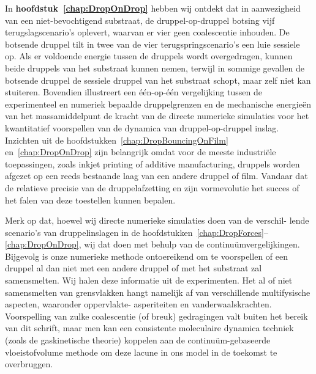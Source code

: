 In \textbf{hoofdstuk~\ref{chap:DropOnDrop}} hebben wij ontdekt dat in aanwezigheid van een niet-bevochtigend substraat, de druppel-op-druppel botsing vijf terugslagscenario's oplevert, waarvan er vier geen coalescentie inhouden. De botsende druppel tilt in twee van de vier terugspringscenario's een luie sessiele op. Als er voldoende energie tussen de druppels wordt overgedragen, kunnen beide druppels van het substraat kunnen nemen, terwijl in sommige gevallen de botsende druppel de sessiele druppel van het substraat schopt, maar zelf niet kan stuiteren. Bovendien illustreert een {\'e}{\'e}n-op-{\'e}{\'e}n vergelijking tussen de experimenteel en numeriek bepaalde druppelgrenzen en de mechanische energieën van het massamiddelpunt de kracht van de directe numerieke simulaties voor het kwantitatief voorspellen van de dynamica van druppel-op-druppel inslag. Inzichten uit de hoofdstukken~\ref{chap:DropBouncingOnFilm}  en~\ref{chap:DropOnDrop}  zijn belangrijk omdat voor de meeste industriële toepassingen, zoals inkjet printing of additive manufacturing, druppels worden afgezet op een reeds bestaande laag van een andere druppel of film. Vandaar dat de relatieve precisie van de druppelafzetting en zijn vormevolutie het succes of het falen van deze toestellen kunnen bepalen. 

Merk op dat, hoewel wij directe numerieke simulaties doen van de verschil- lende scenario’s van druppelinslagen in de hoofdstukken~\ref{chap:DropForces}--\ref{chap:DropOnDrop}, wij dat doen met behulp van de continu{\"u}mvergelijkingen. Bijgevolg is onze numerieke methode ontoereikend om te voorspellen of een druppel al dan niet met een andere druppel of met het substraat zal samensmelten. Wij halen deze informatie uit de experimenten. Het al of niet samensmelten van grensvlakken hangt namelijk af van verschillende multifysische aspecten, waaronder oppervlakte- asperiteiten en vanderwaalskrachten. Voorspelling van zulke coalescentie (of breuk) gedragingen valt buiten het bereik van dit schrift, maar men kan een consistente moleculaire dynamica techniek (zoals de gaskinetische theorie) koppelen aan de continu{\"u}m-gebaseerde vloeistofvolume methode om deze lacune in ons model in de toekomst te overbruggen.

